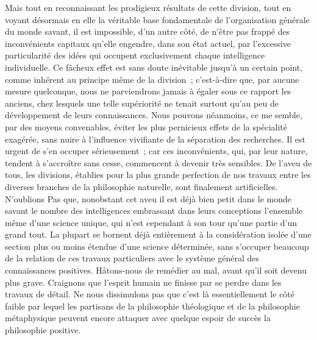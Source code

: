 \documentclass[french,twoside]{book} %
\begin{document}
Mais tout en reconnaissant les prodigieux résultats de cette division, tout en voyant désormais en elle la véritable base fondamentale de l’organisation générale du monde savant, il est impossible, d’un autre côté, de n’être pas frappé des inconvénients capitaux qu’elle engendre, dans son état actuel, par l’excessive particularité des idées qui occupent exclusivement chaque intelligence individuelle. Ce fâcheux effet est sans doute inévitable jusqu’à un certain point, comme inhérent au principe même de la division ; c’est-à-dire que, par aucune mesure quelconque, nous ne parviendrons jamais à égaler sous ce rapport les anciens, chez lesquels une telle supériorité ne tenait surtout qu’au peu de développement de leurs connaissances. Nous pouvons néanmoins, ce me semble, par des moyens convenables, éviter les plus pernicieux effets de la spécialité exagérée, sans nuire à l’influence vivifiante de la séparation des recherches. Il est urgent de s’en occuper sérieusement ; car ces inconvénients, qui, par leur nature, tendent à s’accroître sans cesse, commencent à devenir très sensibles. De l’aveu de tous, les divisions, établies pour la plus grande perfection de nos travaux entre les diverses branches de la philosophie naturelle, sont finalement artificielles. N’oublions Pas que, nonobstant cet aveu il est déjà bien petit dans le monde savant le nombre des intelligences embrassant dans leurs conceptions l’ensemble même d’une science unique, qui n’est cependant à son tour qu’une partie d’un grand tout. La plupart se bornent déjà entièrement à la considération isolée d’une section plus ou moins étendue d’une science déterminée, sans s’occuper beaucoup de la relation de ces travaux particuliers avec le système général des connaissances positives. Hâtons-nous de remédier au mal, avant qu’il soit devenu plus grave. Craignons que l’esprit humain ne finisse par se perdre dans les travaux de détail. Ne nous dissimulons pas que c’est là essentiellement le côté faible par lequel les partisans de la philosophie théologique et de la philosophie métaphysique peuvent encore attaquer avec quelque espoir de succès la philosophie positive.\par
\end{document}
